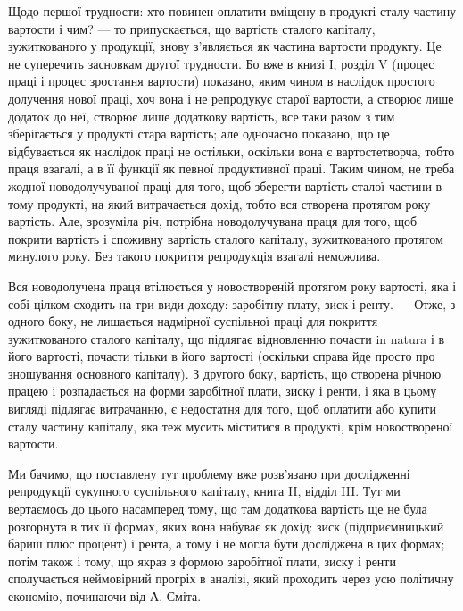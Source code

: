 Щодо першої трудности: хто повинен оплатити вміщену в продукті сталу
частину вартости і чим? — то припускається, що вартість сталого капіталу, зужиткованого у продукції,
знову з’являється як частина вартости продукту. Це не
суперечить засновкам другої трудности. Бо вже в книзі І, розділ  V (процес праці і
процес зростання вартости) показано, яким чином в наслідок простого долучення
нової праці, хоч вона і не репродукує старої вартости, а створює лише додаток
до неї, створює лише додаткову вартість, все таки разом з тим зберігається
у продукті стара вартість; але одночасно показано, що це відбувається як наслідок
праці не остільки, оскільки вона є вартостетворча, тобто праця взагалі, а в її
функції як певної продуктивної праці. Таким чином, не треба жодної новодолучуваної
праці для того, щоб зберегти вартість сталої частини в тому продукті,
на який витрачається дохід, тобто вся створена протягом року вартість. Але,
зрозуміла річ, потрібна новодолучувана праця для того, щоб покрити вартість
і споживну вартість сталого капіталу, зужиткованого протягом минулого
року. Без такого покриття репродукція взагалі неможлива.

Вся новодолучена праця втілюється у новоствореній протягом року вартості,
яка і собі цілком сходить на три види доходу: заробітну плату,
зиск і ренту. — Отже, з одного боку, не лишається надмірної суспільної праці
для покриття зужиткованого сталого капіталу, що підлягає відновленню почасти
in natura і в його вартості, почасти тільки в його вартості (оскільки справа
йде просто про зношування основного капіталу). З другого боку, вартість, що
створена річною працею і розпадається на форми заробітної плати, зиску і ренти,
і яка в цьому вигляді підлягає витрачанню, є недостатня для того, щоб оплатити
або купити сталу частину капіталу, яка теж мусить міститися в продукті,
крім новоствореної вартости.

Ми бачимо, що поставлену тут проблему вже розв’язано при дослідженні
репродукції сукупного суспільного капіталу, книга II, відділ III. Тут ми вертаємось
до цього насамперед тому, що там додаткова вартість ще не була розгорнута
в тих її формах, яких вона набуває як дохід: зиск (підприємницький
бариш плюс процент) і рента, а тому і не могла бути досліджена в цих формах; потім також і тому, що
якраз з формою заробітної плати, зиску і ренти
сполучається неймовірний прогріх в аналізі, який проходить через усю політичну
економію, починаючи від А. Сміта.

